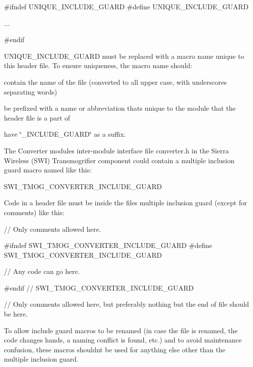 \begin{DoxyCode}
\textcolor{preprocessor}{#ifndef UNIQUE\_INCLUDE\_GUARD}
\textcolor{preprocessor}{#define UNIQUE\_INCLUDE\_GUARD}

...

#endif
\end{DoxyCode}


{\ttfamily U\+N\+I\+Q\+U\+E\+\_\+\+I\+N\+C\+L\+U\+D\+E\+\_\+\+G\+U\+A\+R\+D} must be replaced with a macro name unique to this header file. To ensure uniqueness, the macro name should\+:


\begin{DoxyItemize}
\item contain the name of the file (converted to all upper case, with underscores separating words)
\item be prefixed with a name or abbreviation that\textquotesingle{}s unique to the module that the header file is a part of
\item have \char`\"{}\+\_\+\+I\+N\+C\+L\+U\+D\+E\+\_\+\+G\+U\+A\+R\+D\char`\"{} as a suffix.
\end{DoxyItemize}

The Converter module\textquotesingle{}s inter-\/module interface file converter.\+h\textquotesingle{} in the Sierra Wireless (S\+W\+I) Transmogrifier component could contain a multiple inclusion guard macro named like this\+: 
\begin{DoxyCode}
SWI\_TMOG\_CONVERTER\_INCLUDE\_GUARD
\end{DoxyCode}


Code in a header file must be inside the file\textquotesingle{}s multiple inclusion guard (except for comments) like this\+:


\begin{DoxyCode}
\textcolor{comment}{// Only comments allowed here.}

\textcolor{preprocessor}{#ifndef SWI\_TMOG\_CONVERTER\_INCLUDE\_GUARD}
\textcolor{preprocessor}{#define SWI\_TMOG\_CONVERTER\_INCLUDE\_GUARD}

\textcolor{comment}{// Any code can go here.}

\textcolor{preprocessor}{#endif // SWI\_TMOG\_CONVERTER\_INCLUDE\_GUARD}

\textcolor{comment}{// Only comments allowed here, but preferably nothing but the end of file should be here.}
\end{DoxyCode}


To allow include guard macros to be renamed (in case the file is renamed, the code changes hands, a naming conflict is found, etc.) and to avoid maintenance confusion, these macros shouldn\textquotesingle{}t be used for anything else other than the multiple inclusion guard.

